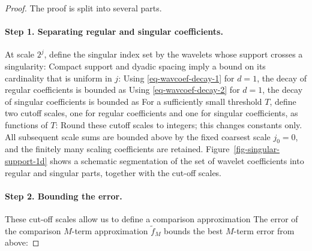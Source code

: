 \begin{proof}
The proof is split into several parts.

  
\paragraph{Step 1. Separating regular and singular coefficients.}

At scale $2^j$, define the singular index set by the wavelets whose support crosses a singularity:
Compact support and dyadic spacing imply a bound on its cardinality that is uniform in $j$:
Using \eqref{eq-wavcoef-decay-1} for $d=1$, the decay of regular coefficients is bounded as
Using \eqref{eq-wavcoef-decay-2} for $d=1$, the decay of singular coefficients is bounded as
For a sufficiently small threshold $T$, define two cutoff scales, one for regular coefficients and one for singular coefficients, as functions of $T$:
Round these cutoff scales to integers; this changes constants only. All subsequent scale sums are bounded above by the fixed coarsest scale $j_0=0$, and the finitely many scaling coefficients are retained. Figure~\ref{fig-singular-support-1d} shows a schematic segmentation of the set of wavelet coefficients into regular and singular parts, together with the cut-off scales.


  
\paragraph{Step 2. Bounding the error.}
These cut-off scales allow us to define a comparison approximation
The error of the comparison $M$-term approximation $\tilde f_M$ bounds the best $M$-term error from above:


\end{proof}
